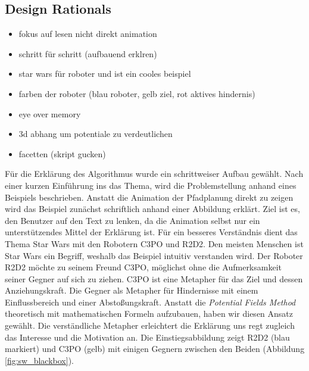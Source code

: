\subsection{Design Rationals}
\begin{itemize}
\item fokus auf lesen nicht direkt animation
\item schritt für schritt (aufbauend erklren)
\item star wars für roboter und ist ein cooles beispiel
\item farben der roboter (blau roboter, gelb ziel, rot aktives hindernis)
\item eye over memory
\item 3d abhang um potentiale zu verdeutlichen
\item facetten (skript gucken)
\end{itemize}
Für die Erklärung des Algorithmus wurde ein schrittweiser Aufbau gewählt. Nach einer kurzen Einführung ins das Thema, wird die Problemstellung anhand eines Beispiels beschrieben. Anstatt die Animation der Pfadplanung direkt zu zeigen wird das Beispiel zunächst schriftlich anhand einer Abbildung erklärt. Ziel ist es, den Benutzer auf den Text zu lenken, da die Animation selbst nur ein unterstützendes Mittel der Erklärung ist.
Für ein besseres Verständnis dient das Thema Star Wars mit den Robotern C3PO und R2D2. Den meisten Menschen ist Star Wars ein Begriff, weshalb das Beispiel intuitiv verstanden wird. Der Roboter R2D2 möchte zu seinem Freund C3PO, möglichst ohne die Aufmerksamkeit seiner Gegner auf sich zu ziehen.
C3PO ist eine Metapher für das Ziel und dessen Anziehungskraft. Die Gegner als Metapher für Hindernisse mit einem Einflussbereich und einer Abstoßungskraft.
Anstatt die \textit{Potential Fields Method} theoretisch mit mathematischen Formeln aufzubauen, haben wir diesen Ansatz gewählt. Die verständliche Metapher erleichtert die Erklärung uns regt zugleich das Interesse und die Motivation an.
Die Einstiegsabbildung zeigt R2D2 (blau markiert) und C3PO (gelb) mit einigen Gegnern zwischen den Beiden (Abbildung \ref{fig:sw_blackbox}).

